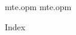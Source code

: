

\load [doc]

\printdoctail mte.opm
\printdoc     mte.opm

\nonum\sec Index
\tt \makeindex
\endmulti

\bye
